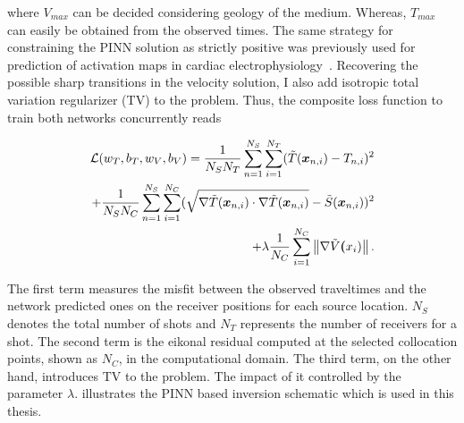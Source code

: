 where $V_{max}$ can be decided considering geology of the medium. Whereas, $T_{max}$ can easily be obtained from the observed times. The same strategy for constraining the PINN solution as strictly positive was previously used for prediction of activation maps in cardiac electrophysiology~\cite{cyphk:20}. Recovering the possible sharp transitions in the velocity solution, I also add isotropic total variation regularizer (TV) to the problem. Thus, the composite loss function to train both networks concurrently reads 

\begin{equation}
\begin{aligned}
    \label{eqn:loss}
     \mathcal{L}(w_{T},b_{T},w_{V},b_{V}) = \frac{1}{N_{S} N_{T}} \sum\limits_{n=1}^{N_{S}} \sum\limits_{i=1}^{N_{T}} (\tilde{T}(\boldsymbol{x}_{n,i}) - T_{n,i})^2 \\ + \frac{1}{N_{S} N_{C}} \sum\limits_{n=1}^{N_{S}} \sum\limits_{i=1}^{N_{C}}(\sqrt{\nabla\tilde{T}(\boldsymbol{x}_{n,i}) \cdot\nabla\tilde{T}(\boldsymbol{x}_{n,i})} - \tilde{S}(\boldsymbol{x}_{n,i}))^2 \\ +
     \lambda \frac{1}{N_{C}}\sum\limits_{i=1}^{N_{C}}\left\Vert {\nabla\tilde{V}\boldsymbol({x}_{i})} \right\Vert.
\end{aligned}     
\end{equation}

The first term measures the misfit between the observed traveltimes and the network predicted ones on the receiver positions for each source location. $N_{S}$ denotes the total number of shots and $N_{T}$ represents the number of receivers for a shot. The second term is the eikonal residual computed at the selected collocation points, shown as $N_{C}$, in the computational domain. The third term, on the other hand, introduces TV to the problem. The impact of it controlled by the parameter $\lambda$.  illustrates the PINN based inversion schematic which is used in this thesis.

